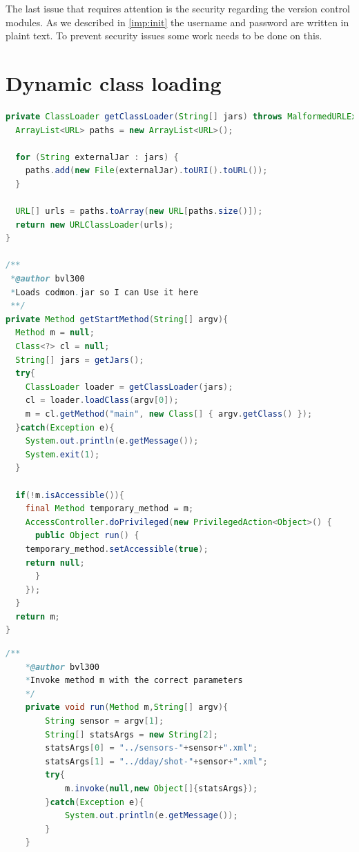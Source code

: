 \documentclass{article}
\begin{document}
\noindent The last issue that requires attention is the security regarding the version control modules. As we described in \ref{imp:init} the username and password are written in plaint text. To prevent 
security issues some work needs to be done on this.

\newpage

\newpage
\appendix
\section{Dynamic class loading}
\label{AppendixA}

\begin{lstlisting}[frame=single ,language=Java]
private ClassLoader getClassLoader(String[] jars) throws MalformedURLException, SecurityException{
  ArrayList<URL> paths = new ArrayList<URL>();

  for (String externalJar : jars) {
    paths.add(new File(externalJar).toURI().toURL());
  }
  
  URL[] urls = paths.toArray(new URL[paths.size()]);
  return new URLClassLoader(urls);
}	

/**
 *@author bvl300
 *Loads codmon.jar so I can Use it here
 **/
private Method getStartMethod(String[] argv){	
  Method m = null;
  Class<?> cl = null;
  String[] jars = getJars();
  try{
    ClassLoader loader = getClassLoader(jars);
    cl = loader.loadClass(argv[0]);
    m = cl.getMethod("main", new Class[] { argv.getClass() });
  }catch(Exception e){
    System.out.println(e.getMessage());
    System.exit(1);
  }

  if(!m.isAccessible()){
    final Method temporary_method = m;
    AccessController.doPrivileged(new PrivilegedAction<Object>() {
      public Object run() {
	temporary_method.setAccessible(true);
	return null;
      }
    });
  }
  return m;
} 
\end{lstlisting} 
\newpage
{}
\begin{lstlisting}[frame=single ,language=Java]
	/**
 	*@author bvl300
 	*Invoke method m with the correct parameters
 	*/ 
	private void run(Method m,String[] argv){
		String sensor = argv[1];
		String[] statsArgs = new String[2];
		statsArgs[0] = "../sensors-"+sensor+".xml";
		statsArgs[1] = "../dday/shot-"+sensor+".xml";
		try{
			m.invoke(null,new Object[]{statsArgs});
		}catch(Exception e){
			System.out.println(e.getMessage());
		}
	}
\end{lstlisting}  
\end{document}
